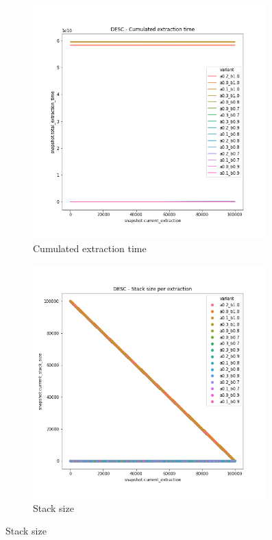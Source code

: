 \begin{figure}
    \centering
    \begin{subfigure}[b]{0.45\textwidth}
        \centering
        \includegraphics[width=0.99\textwidth]{./fragments/04_experimental_execution/images/04_alphabeta_detail_decreasing.png.0_0.png}
        \caption{Cumulated extraction time}
        \label{FIG:05_ALPHABETA_BENCHMARK_DESC__0_0}
    \end{subfigure}
    \begin{subfigure}[b]{0.45\textwidth}
        \centering
        \includegraphics[width=0.99\textwidth]{./fragments/04_experimental_execution/images/04_alphabeta_detail_decreasing.png.2_0.png}
        \caption{Stack size}
        \label{FIG:05_ALPHABETA_BENCHMARK_DESC__0_0}
    \end{subfigure}


\end{figure}
